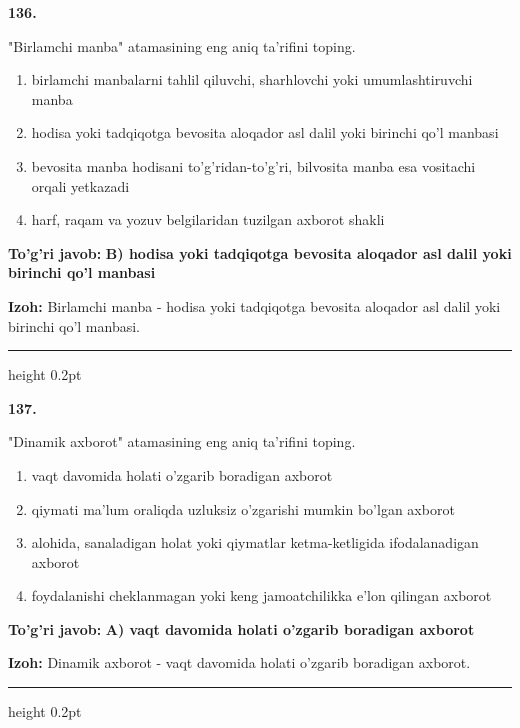 \documentclass[10pt,a4paper,oneside]{article}
\begin{document}
\noindent\textbf{\color{ink}136.}
\par
"Birlamchi manba" atamasining eng aniq ta'rifini toping.
\begin{enumerate}[label=\Alph*),leftmargin=9mm]
\item birlamchi manbalarni tahlil qiluvchi, sharhlovchi yoki umumlashtiruvchi manba
\item hodisa yoki tadqiqotga bevosita aloqador asl dalil yoki birinchi qo'l manbasi
\item bevosita manba hodisani to'g'ridan-to'g'ri, bilvosita manba esa vositachi orqali yetkazadi
\item harf, raqam va yozuv belgilaridan tuzilgan axborot shakli
\end{enumerate}
\begin{tcolorbox}[enhanced,breakable,colback=teal!4,colframe=teal!50!black,boxrule=0.5pt,arc=1.1mm,left=3mm,right=3mm,top=1.7mm,bottom=1.7mm,before skip=2mm,after skip=2mm]
\textbf{\color{teal}To'g'ri javob:} \textbf{B) hodisa yoki tadqiqotga bevosita aloqador asl dalil yoki birinchi qo'l manbasi}
\par\smallskip
\textbf{Izoh:} Birlamchi manba - hodisa yoki tadqiqotga bevosita aloqador asl dalil yoki birinchi qo'l manbasi.
\end{tcolorbox}
\vspace{2mm}\hrule height 0.2pt \vspace{3mm}

\noindent\textbf{\color{ink}137.}
\par
"Dinamik axborot" atamasining eng aniq ta'rifini toping.
\begin{enumerate}[label=\Alph*),leftmargin=9mm]
\item vaqt davomida holati o'zgarib boradigan axborot
\item qiymati ma'lum oraliqda uzluksiz o'zgarishi mumkin bo'lgan axborot
\item alohida, sanaladigan holat yoki qiymatlar ketma-ketligida ifodalanadigan axborot
\item foydalanishi cheklanmagan yoki keng jamoatchilikka e'lon qilingan axborot
\end{enumerate}
\begin{tcolorbox}[enhanced,breakable,colback=teal!4,colframe=teal!50!black,boxrule=0.5pt,arc=1.1mm,left=3mm,right=3mm,top=1.7mm,bottom=1.7mm,before skip=2mm,after skip=2mm]
\textbf{\color{teal}To'g'ri javob:} \textbf{A) vaqt davomida holati o'zgarib boradigan axborot}
\par\smallskip
\textbf{Izoh:} Dinamik axborot - vaqt davomida holati o'zgarib boradigan axborot.
\end{tcolorbox}
\vspace{2mm}\hrule height 0.2pt \vspace{3mm}
\end{document}
